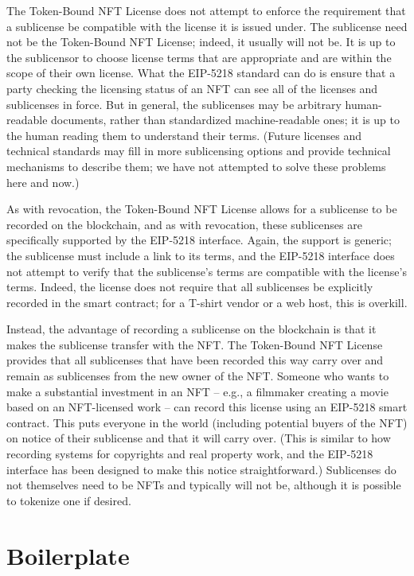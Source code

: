 \documentclass{article}
\newcommand{\eiplicense}{EIP-5218\xspace}
\newcommand{\iccclicense}{Token-Bound NFT License\xspace}
\begin{document}
The \iccclicense does not attempt to enforce the requirement that a sublicense be compatible with the license it is issued under. The sublicense need not be the \iccclicense; indeed, it usually will not be. It is up to the sublicensor to choose license terms that are appropriate and are within the scope of their own license. What the \eiplicense standard can do is ensure that a party checking the licensing status of an NFT can see all of the licenses and sublicenses in force. But in general, the sublicenses may be arbitrary human-readable documents, rather than standardized machine-readable ones; it is up to the human reading them to understand their terms. (Future licenses and technical standards may fill in more sublicensing options and provide technical mechanisms to describe them; we have not attempted to solve these problems here and now.)

As with revocation, the \iccclicense allows for a sublicense to be recorded on the blockchain, and as with revocation, these sublicenses are specifically supported by the \eiplicense interface. Again, the support is generic; the sublicense must include a link to its terms, and the \eiplicense interface does not attempt to verify that the sublicense's terms are compatible with the license's terms. Indeed, the license does not require that all sublicenses be explicitly recorded in the smart contract; for a T-shirt vendor or a web host, this is overkill. 

Instead, the advantage of recording a sublicense on the blockchain is that it makes the sublicense transfer with the NFT. The \iccclicense provides that all sublicenses that have been recorded this way carry over and remain as sublicenses from the new owner of the NFT. Someone who wants to make a substantial investment in an NFT -- e.g., a filmmaker creating a movie based on an NFT-licensed work -- can record this license using an \eiplicense smart contract. This puts everyone in the world (including potential buyers of the NFT) on notice of their sublicense and that it will carry over. (This is similar to how recording systems for copyrights and real property work, and the \eiplicense interface has been designed to make this notice straightforward.)  Sublicenses do not themselves need to be NFTs and typically will not be, although it is possible to tokenize one if desired.



\section{Boilerplate}
\end{document}
